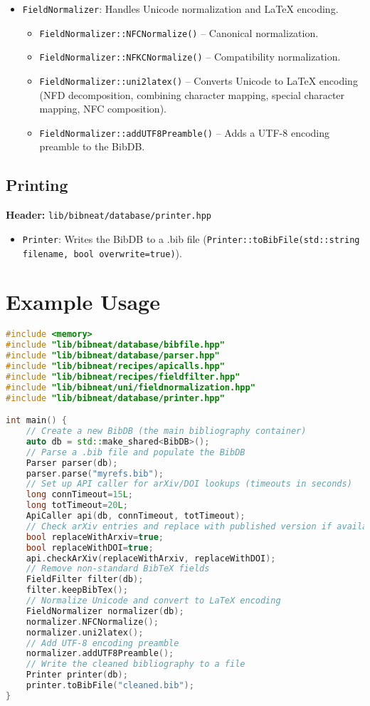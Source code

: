 \documentclass[11pt]{article}
\begin{document}
\begin{itemize}
  \item \texttt{FieldNormalizer}: Handles Unicode normalization and LaTeX encoding.
    \begin{itemize}
      \item \texttt{FieldNormalizer::NFCNormalize()} -- Canonical normalization.
      \item \texttt{FieldNormalizer::NFKCNormalize()} -- Compatibility normalization.
      \item \texttt{FieldNormalizer::uni2latex()} -- Converts Unicode to LaTeX encoding (NFD decomposition, combining character mapping, special character mapping, NFC composition).
      \item \texttt{FieldNormalizer::addUTF8Preamble()} -- Adds a UTF-8 encoding preamble to the BibDB.
    \end{itemize}
\end{itemize}

\subsection{Printing}
\textbf{Header:} \texttt{lib/bibneat/database/printer.hpp}

\begin{itemize}
  \item \texttt{Printer}: Writes the BibDB to a .bib file (\texttt{Printer::toBibFile(std::string filename, bool overwrite=true)}).
\end{itemize}

\section{Example Usage}
\begin{lstlisting}[language=C++]
#include <memory>
#include "lib/bibneat/database/bibfile.hpp"
#include "lib/bibneat/database/parser.hpp"
#include "lib/bibneat/recipes/apicalls.hpp"
#include "lib/bibneat/recipes/fieldfilter.hpp"
#include "lib/bibneat/uni/fieldnormalization.hpp"
#include "lib/bibneat/database/printer.hpp"

int main() {
    // Create a new BibDB (the main bibliography container)
    auto db = std::make_shared<BibDB>();
    // Parse a .bib file and populate the BibDB
    Parser parser(db);
    parser.parse("myrefs.bib");
    // Set up API caller for arXiv/DOI lookups (timeouts in seconds)
    long connTimeout=15L;
    long totTimeout=20L;
    ApiCaller api(db, connTimeout, totTimeout);
    // Check arXiv entries and replace with published version if available
    bool replaceWithArxiv=true;
    bool replaceWithDOI=true;
    api.checkArXiv(replaceWithArxiv, replaceWithDOI);
    // Remove non-standard BibTeX fields
    FieldFilter filter(db);
    filter.keepBibTex();
    // Normalize Unicode and convert to LaTeX encoding
    FieldNormalizer normalizer(db);
    normalizer.NFCNormalize();
    normalizer.uni2latex();
    // Add UTF-8 encoding preamble
    normalizer.addUTF8Preamble();
    // Write the cleaned bibliography to a file
    Printer printer(db);
    printer.toBibFile("cleaned.bib");
}
\end{lstlisting}
\end{document}
